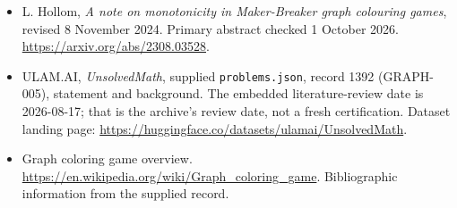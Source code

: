 \documentclass[11pt,a4paper]{article}
\begin{document}
{\small

\begin{itemize}
\item[E1] L. Hollom, \emph{A note on monotonicity in Maker-Breaker graph colouring games}, revised 8 November 2024. Primary abstract checked 1 October 2026. \url{https://arxiv.org/abs/2308.03528}.


\item[\hypertarget{source:1392:1}{S1}] ULAM.AI, \emph{UnsolvedMath}, supplied \texttt{problems.json}, record 1392 (GRAPH-005), statement and background. The embedded literature-review date is 2026-08-17; that is the archive’s review date, not a fresh certification. Dataset landing page: \url{https://huggingface.co/datasets/ulamai/UnsolvedMath}.

\item[\hypertarget{source:1392:2}{S2}] Graph coloring game overview. \url{https://en.wikipedia.org/wiki/Graph_coloring_game}. Bibliographic information from the supplied record.

\end{itemize}

}

\label{end:1392}
\end{document}
